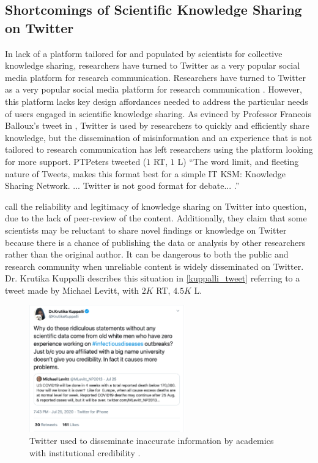 \documentclass[acmsmall,authordraft]{acmart}
\begin{document}
\subsection{Shortcomings of Scientific Knowledge Sharing on Twitter}
\label{Shortcomings of Scientific Knowledge Sharing on Twitter}

In lack of a platform tailored for and populated by scientists for collective knowledge sharing, researchers have turned to Twitter as a very popular social media platform for research communication. Researchers have turned to Twitter as a very popular social media platform for research communication \citep{collins2016scientists, ke2017systematic, van2011scientists}. However, this platform lacks key design affordances needed to address the particular needs of users engaged in scientific knowledge sharing. As evinced by Professor Francois Balloux's tweet in 
, Twitter is used by researchers to quickly and efficiently share knowledge, but the dissemination of misinformation and an experience that is not tailored to research communication has left researchers using the platform looking for more support.
PTPeters tweeted ($1$ RT, $1$ L) ``The word limit, and fleeting nature of Tweets, makes this format best for a simple IT KSM: Knowledge Sharing Network. ... Twitter is not good format for debate... \citep{Peters2020twitter}.''

\citet{lacassin2020rapid} call the reliability and legitimacy of knowledge sharing on Twitter into question, due to the lack of peer-review of the content. Additionally, they claim that some scientists may be reluctant to share novel findings or knowledge on Twitter because there is a chance of publishing the data or analysis by other researchers rather than the original author. It can be dangerous to both the public and research community when unreliable content is widely disseminated on Twitter. Dr. Krutika Kuppalli describes this situation in \autoref{kuppalli_tweet} referring to a tweet made by Michael Levitt, with $2K$ RT, $4.5K$ L.

\begin{figure}
  \includegraphics[width=0.6\textwidth]{Pictures/kuppalli_tweet.png}
  \caption{Twitter used to disseminate inaccurate information by academics with institutional credibility \citep{kuppalli2020twitter}.}
  \label{kuppalli_tweet}
\end{figure}
\end{document}
